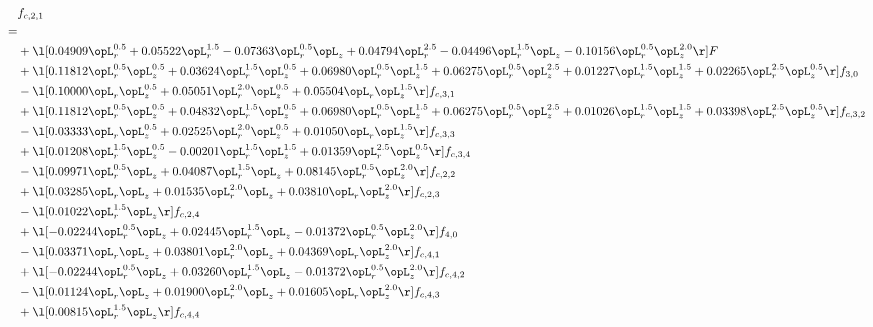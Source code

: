 \begin{alignat}{2} 
\label{eq:f_21_2} 
& f_{c,2,1} \nonumber \\ 
 = \\ 
& + \l[  0.04909 \opL_r^{0.5} +  0.05522 \opL_r^{1.5}   -0.07363 \opL_r^{0.5} \opL_z +  0.04794 \opL_r^{2.5}   -0.04496 \opL_r^{1.5} \opL_z   -0.10156 \opL_r^{0.5} \opL_z^{2.0}  \r] F \nonumber \\ 
& + \l[  0.11812 \opL_r^{0.5} \opL_z^{0.5} +  0.03624 \opL_r^{1.5} \opL_z^{0.5} +  0.06980 \opL_r^{0.5} \opL_z^{1.5} +  0.06275 \opL_r^{0.5} \opL_z^{2.5} +  0.01227 \opL_r^{1.5} \opL_z^{1.5} +  0.02265 \opL_r^{2.5} \opL_z^{0.5}  \r] f_{3,0} \nonumber \\ 
& - \l[  0.10000 \opL_r \opL_z^{0.5} +  0.05051 \opL_r^{2.0} \opL_z^{0.5} +  0.05504 \opL_r \opL_z^{1.5}  \r] f_{c,3,1} \nonumber \\ 
& + \l[  0.11812 \opL_r^{0.5} \opL_z^{0.5} +  0.04832 \opL_r^{1.5} \opL_z^{0.5} +  0.06980 \opL_r^{0.5} \opL_z^{1.5} +  0.06275 \opL_r^{0.5} \opL_z^{2.5} +  0.01026 \opL_r^{1.5} \opL_z^{1.5} +  0.03398 \opL_r^{2.5} \opL_z^{0.5}  \r] f_{c,3,2} \nonumber \\ 
& - \l[  0.03333 \opL_r \opL_z^{0.5} +  0.02525 \opL_r^{2.0} \opL_z^{0.5} +  0.01050 \opL_r \opL_z^{1.5}  \r] f_{c,3,3} \nonumber \\ 
& + \l[  0.01208 \opL_r^{1.5} \opL_z^{0.5}   -0.00201 \opL_r^{1.5} \opL_z^{1.5} +  0.01359 \opL_r^{2.5} \opL_z^{0.5}  \r] f_{c,3,4} \nonumber \\ 
& - \l[  0.09971 \opL_r^{0.5} \opL_z +  0.04087 \opL_r^{1.5} \opL_z +  0.08145 \opL_r^{0.5} \opL_z^{2.0}  \r] f_{c,2,2} \nonumber \\ 
& + \l[  0.03285 \opL_r \opL_z +  0.01535 \opL_r^{2.0} \opL_z +  0.03810 \opL_r \opL_z^{2.0}  \r] f_{c,2,3} \nonumber \\ 
& - \l[  0.01022 \opL_r^{1.5} \opL_z  \r] f_{c,2,4} \nonumber \\ 
& + \l[  -0.02244 \opL_r^{0.5} \opL_z +  0.02445 \opL_r^{1.5} \opL_z   -0.01372 \opL_r^{0.5} \opL_z^{2.0}  \r] f_{4,0} \nonumber \\ 
& - \l[  0.03371 \opL_r \opL_z +  0.03801 \opL_r^{2.0} \opL_z +  0.04369 \opL_r \opL_z^{2.0}  \r] f_{c,4,1} \nonumber \\ 
& + \l[  -0.02244 \opL_r^{0.5} \opL_z +  0.03260 \opL_r^{1.5} \opL_z   -0.01372 \opL_r^{0.5} \opL_z^{2.0}  \r] f_{c,4,2} \nonumber \\ 
& - \l[  0.01124 \opL_r \opL_z +  0.01900 \opL_r^{2.0} \opL_z +  0.01605 \opL_r \opL_z^{2.0}  \r] f_{c,4,3} \nonumber \\ 
& + \l[  0.00815 \opL_r^{1.5} \opL_z  \r] f_{c,4,4} \nonumber \\ 
\end{alignat} 


